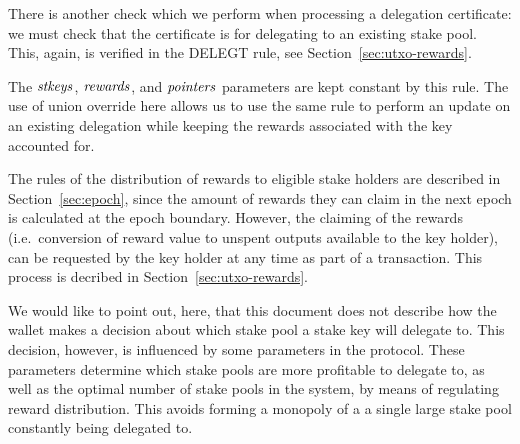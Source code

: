 There is another check which we perform when processing a delegation certificate:
we must check that the certificate is for delegating to an
existing stake pool. This, again, is verified in the DELEGT rule, see
Section~\ref{sec:utxo-rewards}.

The $\mathit{stkeys}$, $\mathit{rewards}$, and $\mathit{pointers}$ parameters are kept constant by
this rule. The use of union override here allows us to use the same rule
to perform an update on an existing delegation while keeping the rewards
associated with the key accounted for.

The rules of the distribution of rewards to eligible stake holders are described
in Section~\ref{sec:epoch}, since the amount of rewards they can claim in the next
epoch is calculated at the epoch boundary. However, the claiming of the rewards
(i.e.\ conversion of reward value to unspent outputs available to the key
holder), can be requested by the key holder at any time as part of a transaction.
This process is decribed in Section~\ref{sec:utxo-rewards}.

We would like to point out, here, that this document does not describe
how the wallet makes a decision about which stake pool a stake key will
delegate to. This decision, however, is influenced by some parameters in the
protocol. These parameters determine which stake pools are more profitable
to delegate to, as well as the optimal number of stake pools in the system,
by means of regulating reward distribution.
This avoids forming a monopoly of a a single large stake pool constantly
being delegated to.


